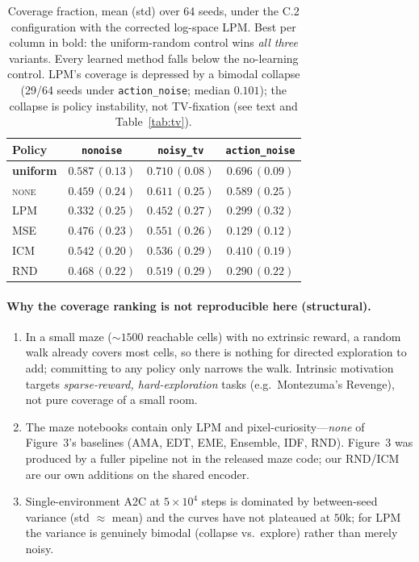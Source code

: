 \documentclass[11pt]{article}
\begin{document}
\begin{table}[h]
\centering
\begin{tabular}{@{}lccc@{}}
\toprule
\textbf{Policy} & \texttt{nonoise} & \texttt{noisy\_tv} & \texttt{action\_noise} \\
\midrule
\textbf{uniform} & $\mathbf{0.587\,(0.13)}$ & $\mathbf{0.710\,(0.08)}$ & $\mathbf{0.696\,(0.09)}$ \\
\textsc{none}    & $0.459\,(0.24)$ & $0.611\,(0.25)$ & $0.589\,(0.25)$ \\
LPM              & $0.332\,(0.25)$ & $0.452\,(0.27)$ & $0.299\,(0.32)$ \\
MSE              & $0.476\,(0.23)$ & $0.551\,(0.26)$ & $0.129\,(0.12)$ \\
ICM              & $0.542\,(0.20)$ & $0.536\,(0.29)$ & $0.410\,(0.19)$ \\
RND              & $0.468\,(0.22)$ & $0.519\,(0.29)$ & $0.290\,(0.22)$ \\
\bottomrule
\end{tabular}
\caption{Coverage fraction, mean (std) over 64 seeds, under the C.2 configuration with the corrected
log-space LPM. Best per column in bold: the uniform-random control wins \emph{all three} variants.
Every learned method falls below the no-learning control. LPM's coverage is depressed by a bimodal
collapse (29/64 seeds under \texttt{action\_noise}; median $0.101$); the collapse is policy
instability, not TV-fixation (see text and Table~\ref{tab:tv}).}
\label{tab:cov}
\end{table}

\paragraph{Why the coverage ranking is not reproducible here (structural).}
\begin{enumerate}[leftmargin=1.6em]
  \item In a small maze ($\sim\!1500$ reachable cells) with no extrinsic reward, a random walk
  already covers most cells, so there is nothing for directed exploration to add; committing to any
  policy only narrows the walk. Intrinsic motivation targets \emph{sparse-reward, hard-exploration}
  tasks (e.g.\ Montezuma's Revenge), not pure coverage of a small room.
  \item The maze notebooks contain only LPM and pixel-curiosity---\emph{none} of Figure~3's baselines
  (AMA, EDT, EME, Ensemble, IDF, RND). Figure~3 was produced by a fuller pipeline not in the released
  maze code; our RND/ICM are our own additions on the shared encoder.
  \item Single-environment A2C at $5\times10^{4}$ steps is dominated by between-seed variance
  (std $\approx$ mean) and the curves have not plateaued at $50$k; for LPM the variance is genuinely
  bimodal (collapse vs.\ explore) rather than merely noisy.
\end{enumerate}
\end{document}
